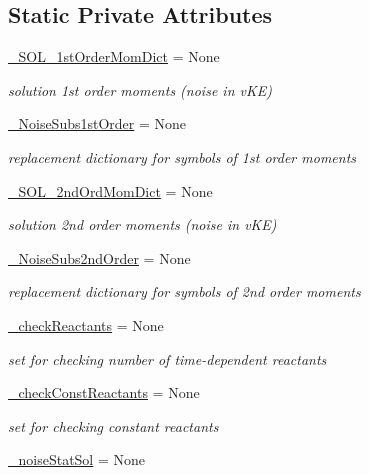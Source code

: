 \subsection*{Static Private Attributes}
\begin{DoxyCompactItemize}
\item 
\hyperlink{class_mu_mo_t_1_1_mu_mo_t_1_1_mu_mo_tnoise_view_a296250af1fa7174eea4104b344417b90}{\+\_\+\+S\+O\+L\+\_\+1st\+Order\+Mom\+Dict} = None
\begin{DoxyCompactList}\small\item\em solution 1st order moments (noise in v\+KE) \end{DoxyCompactList}\item 
\hyperlink{class_mu_mo_t_1_1_mu_mo_t_1_1_mu_mo_tnoise_view_ad481992f34b8ccf5d64d223cc55631f1}{\+\_\+\+Noise\+Subs1st\+Order} = None
\begin{DoxyCompactList}\small\item\em replacement dictionary for symbols of 1st order moments \end{DoxyCompactList}\item 
\hyperlink{class_mu_mo_t_1_1_mu_mo_t_1_1_mu_mo_tnoise_view_a791676592e6ef1620caf2efb21c9d398}{\+\_\+\+S\+O\+L\+\_\+2nd\+Ord\+Mom\+Dict} = None
\begin{DoxyCompactList}\small\item\em solution 2nd order moments (noise in v\+KE) \end{DoxyCompactList}\item 
\hyperlink{class_mu_mo_t_1_1_mu_mo_t_1_1_mu_mo_tnoise_view_a3a833e83790a135218b980c75d031bc2}{\+\_\+\+Noise\+Subs2nd\+Order} = None
\begin{DoxyCompactList}\small\item\em replacement dictionary for symbols of 2nd order moments \end{DoxyCompactList}\item 
\hyperlink{class_mu_mo_t_1_1_mu_mo_t_1_1_mu_mo_tnoise_view_a67947eab5f25a49aed08d7ba84992bdb}{\+\_\+check\+Reactants} = None
\begin{DoxyCompactList}\small\item\em set for checking number of time-\/dependent reactants \end{DoxyCompactList}\item 
\hyperlink{class_mu_mo_t_1_1_mu_mo_t_1_1_mu_mo_tnoise_view_ac697abee533ce7967dba1ca8450f6153}{\+\_\+check\+Const\+Reactants} = None
\begin{DoxyCompactList}\small\item\em set for checking constant reactants \end{DoxyCompactList}\item 
\hyperlink{class_mu_mo_t_1_1_mu_mo_t_1_1_mu_mo_tnoise_view_abeed4a9b1de71e913d16fc6363f13f03}{\+\_\+noise\+Stat\+Sol} = None
\end{DoxyCompactItemize}
